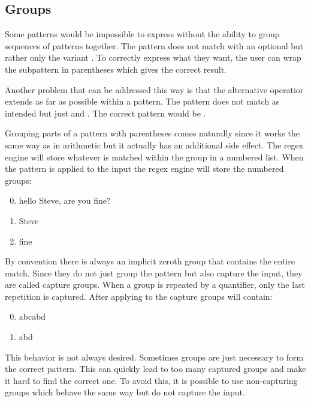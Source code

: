\subsection{Groups} \label{sec:introGroups}

Some patterns would be impossible to express without the ability to group sequences of patterns together. The pattern  does not match  with an optional  but rather only the variant . To correctly express what they want, the user can wrap the subpattern in parentheses  which gives the correct result.

Another problem that can be addressed this way is that the alternative operatior extends as far as possible within a pattern. The pattern  does not match  as intended but just  and . The correct pattern would be .

Grouping parts of a pattern with parentheses comes naturally since it works the same way as in arithmetic but it actually has an additional side effect. The regex engine will store whatever is matched within the group in a numbered list. When the pattern  is applied to the input  the regex engine will store the numbered groups:

\begin{enumerate}
    \setcounter{enumi}{-1} 
    \itemsep0em
    \item hello Steve, are you fine?
    \item Steve
    \item fine
\end{enumerate}

By convention there is always an implicit zeroth group that contains the entire match. Since they do not just group the pattern but also capture the input, they are called capture groups. When a group is repeated by a quantifier, only the last repetition is captured. After applying  to  the capture groups will contain:

\begin{enumerate}
    \setcounter{enumi}{-1} 
    \itemsep0em
    \item abcabd
    \item abd
\end{enumerate}


This behavior is not always desired. Sometimes groups are just necessary to form the correct pattern. This can quickly lead to too many captured groups and make it hard to find the correct one. To avoid this, it is possible to use non-capturing groups  which behave the same way but do not capture the input.

